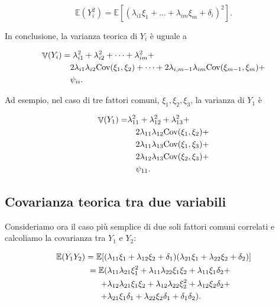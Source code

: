 \documentclass[
  11pt,
]{krantz}
\DeclareMathOperator{\V}{\mathbb{V}} %
\newcommand{\E}{\mathbb{E}} %
\theoremstyle{definition}
\theoremstyle{definition}
\theoremstyle{definition}
\theoremstyle{definition}
\theoremstyle{remark}
\begin{document}
\[
\E(Y_i^2) = \E[(\lambda_{i1} \xi_1 + \dots + \lambda_{im} \xi_m + \delta_i)^2].
\]

In conclusione, la varianza teorica di \(Y_i\) è uguale a

\begin{equation}
\begin{split}
\V(Y_i) &= \lambda_{i1}^2 + \lambda_{i2}^2 + \dots + \lambda_{im}^2  + \\
&\quad 2 \lambda_{i1} \lambda_{i2} \mbox{Cov}(\xi_1, \xi_2) + \dots + 2 \lambda_{i,m-1} \lambda_{im} \mbox{Cov}(\xi_{m-1}, \xi_m) + \\
&\quad \psi_{ii}.\notag
\end{split}
\end{equation}

Ad esempio, nel caso di tre fattori comuni, \(\xi_1, \xi_2, \xi_3\), la varianza di \(Y_1\) è

\begin{equation}
\begin{split}
\V(Y_1) = &\lambda_{11}^2 + \lambda_{12}^2 + \lambda_{13}^2 +\\ 
&\quad 2 \lambda_{11} \lambda_{12} \mbox{Cov}(\xi_1, \xi_2) + \\ 
&\quad 2 \lambda_{11} \lambda_{13} \mbox{Cov}(\xi_1, \xi_3) + \\ 
&\quad 2 \lambda_{12} \lambda_{13} \mbox{Cov}(\xi_2, \xi_3) + \\ 
&\quad \psi_{11}. \notag
\end{split}
\end{equation}

\hypertarget{covarianza-teorica-tra-due-variabili}{%
\subsection{Covarianza teorica tra due variabili}\label{covarianza-teorica-tra-due-variabili}}

Consideriamo ora il caso più semplice di due soli fattori comuni correlati e calcoliamo la covarianza tra \(Y_1\) e \(Y_2\):

\begin{equation}
\begin{aligned}
\E(Y_1 Y_2) =\E[(&\lambda_{11}\xi_1 + \lambda_{12}\xi_2+\delta_1) (\lambda_{21}\xi_1 + \lambda_{22}\xi_2+\delta_2)]\notag\\
=\E( 
&\lambda_{11}\lambda_{21}\xi_1^2 +
\lambda_{11}\lambda_{22}\xi_1\xi_2 +
\lambda_{11}\xi_1\delta_2 +\notag\\
+&\lambda_{12}\lambda_{21}\xi_1\xi_2 +
\lambda_{12}\lambda_{22}\xi_2^2 +
\lambda_{12}\xi_2\delta_2 +\notag\\
+&\lambda_{21}\xi_1\delta_1 +
\lambda_{22}\xi_2\delta_1 +
\delta_1\delta_2).\notag
\end{aligned}
\end{equation}
\end{document}
